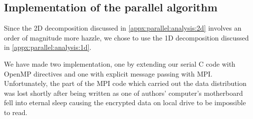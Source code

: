 \subsection{Implementation of the parallel algorithm}
Since the 2D decomposition discussed in \ref{appx:parallel:analysis:2d} involves an order of magnitude more hazzle, we chose to use the 1D decomposition discussed in \ref{appx:parallel:analysis:1d}.

We have made two implementation, one by extending our serial C code with OpenMP directives and one with explicit message passing with MPI.
Unfortunately, the part of the MPI code which carried out the data distribution was lost shortly after being written as one of authors' computer's motherboard fell into eternal sleep causing the encrypted data on local drive to be impossible to read.
